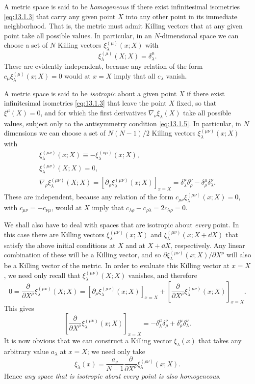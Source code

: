 A metric space is said to be \emph{homogeneous} if there exist infinitesimal
isometries \eqref{eq:13.1.3} that carry any given point \(X\) into any other
point in its immediate neighborhood. That is, the metric must admit Killing
vectors that at any given point take all possible values. In particular, in
an \(N\)-dimensional space we can choose a set of \(N\) Killing vectors
\(\xi_\lambda^{(\mu)}(x;X)\) with
\[
  \xi_\lambda^{(\mu)}(X;X)=\delta_\lambda^\mu.
\]
These are evidently independent, because any relation of the form
\(c_\mu\xi_\lambda^{(\mu)}(x;X)=0\) would at \(x=X\) imply that all
\(c_\lambda\) vanish.

A metric space is said to be \emph{isotropic} about a given point \(X\) if
there exist infinitesimal isometries \eqref{eq:13.1.3} that leave the point
\(X\) fixed, so that \(\xi^\mu(X)=0\), and for which the first derivatives
\(\nabla_\nu\xi_\lambda(X)\) take all possible values, subject only to the
antisymmetry condition \eqref{eq:13.1.5}. In particular, in \(N\)
dimensions we can choose a set of \(N(N-1)/2\) Killing vectors
\(\xi_\lambda^{(\mu\nu)}(x;X)\) with
\begin{gather*}
  \xi_\lambda^{(\mu\nu)}(x;X)
  \equiv-\xi_\lambda^{(\nu\mu)}(x;X),\\
  \xi_\lambda^{(\mu\nu)}(X;X)=0,\\
  \nabla_\rho\xi_\lambda^{(\mu\nu)}(X;X)
  =
  \left[
    \partial_\rho\xi_\lambda^{(\mu\nu)}(x;X)
  \right]_{x=X}
  =
  \delta_\lambda^\mu\delta_\rho^\nu
  -\delta_\rho^\mu\delta_\lambda^\nu.
\end{gather*}
These are independent, because any relation of the form
\(c_{\mu\nu}\xi_\lambda^{(\mu\nu)}(x;X)=0\), with
\(c_{\mu\nu}=-c_{\nu\mu}\), would at \(X\) imply that
\(c_{\lambda\rho}-c_{\rho\lambda}=2c_{\lambda\rho}=0\).

We shall also have to deal with spaces that are isotropic about \emph{every}
point. In this case there are Killing vectors
\(\xi_\lambda^{(\mu\nu)}(x;X)\) and
\(\xi_\lambda^{(\mu\nu)}(x;X+\dd X)\) that satisfy the above initial
conditions at \(X\) and at \(X+\dd X\), respectively. Any linear combination
of these will be a Killing vector, and so
\(\partial\xi_\lambda^{(\mu\nu)}(x;X)/\partial X^\rho\) will also be a
Killing vector of the metric. In order to evaluate this Killing vector at
\(x=X\), we need only recall that \(\xi_\lambda^{(\mu\nu)}(X;X)\)
vanishes, and therefore
\[
  0
  =
  \frac{\partial}{\partial X^\rho}
  \xi_\lambda^{(\mu\nu)}(X;X)
  =
  \left[
    \partial_\rho\xi_\lambda^{(\mu\nu)}(x;X)
  \right]_{x=X}
  +
  \left[
    \frac{\partial}{\partial X^\rho}
    \xi_\lambda^{(\mu\nu)}(x;X)
  \right]_{x=X}.
\]
This gives
\[
  \left[
    \frac{\partial}{\partial X^\rho}
    \xi_\lambda^{(\mu\nu)}(x;X)
  \right]_{x=X}
  =
  -\delta_\lambda^\mu\delta_\rho^\nu
  +\delta_\rho^\mu\delta_\lambda^\nu.
\]
It is now obvious that we can construct a Killing vector \(\xi_\lambda(x)\)
that takes any arbitrary value \(a_\lambda\) at \(x=X\); we need only take
\[
  \xi_\lambda(x)
  =
  \frac{a_\nu}{N-1}
  \frac{\partial}{\partial X^\rho}
  \xi_\lambda^{(\rho\nu)}(x;X).
\]
Hence \emph{any space that is isotropic about every point is also
homogeneous}.


